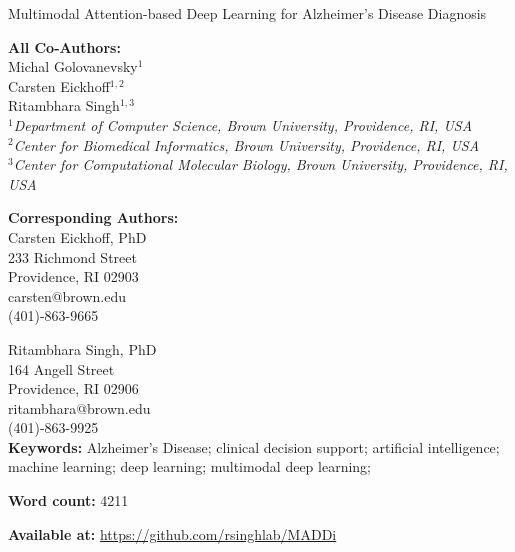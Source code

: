\documentclass[11pt]{article}
\begin{document}
\begin{titlepage}
    \begin{center}
        \vspace*{1cm}

        \LARGE{Multimodal Attention-based Deep Learning for Alzheimer’s Disease Diagnosis}
        \vspace*{1cm}
    \end{center}
    
    \noindent \large{\textbf{All Co-Authors:}}\vspace*{0.1cm}\\
    \noindent Michal Golovanevsky$^1$\\
    \noindent Carsten Eickhoff$^{1,2}$\\
    \noindent Ritambhara Singh$^{1,3}$\\
    
    \noindent \footnotesize{\textit{$^1$Department of Computer Science, Brown University, Providence, RI, USA}}\\
    \footnotesize{\textit{$^2$Center for Biomedical Informatics, Brown University, Providence, RI, USA}}\\
    \footnotesize{\textit{$^3$Center for Computational Molecular Biology, Brown University, Providence, RI, USA}}\\
        
    \vspace*{1cm}
    
    \noindent \large{\textbf{Corresponding Authors:}}\vspace*{0.1cm}\\
    \noindent Carsten Eickhoff, PhD\\
    233 Richmond Street\\
    Providence, RI 02903\\
    carsten@brown.edu\\
    (401)-863-9665 \\
    \vspace*{0.25cm}
    
    \noindent Ritambhara Singh, PhD\\
    164 Angell Street\\
    Providence, RI 02906\\
    ritambhara@brown.edu\\
    (401)-863-9925\\
    
    \vspace*{1cm}
    \noindent \large{\textbf{Keywords:}} Alzheimer’s Disease; clinical decision support; artificial intelligence; machine learning; deep learning; multimodal deep learning;
    \vspace*{1cm}
    
    \noindent \large{\textbf{Word count:}} 4211
    \vspace*{1cm}
    
    \noindent
    \textbf{Available at:} \url{https://github.com/rsinghlab/MADDi}
    \noindent


        


            

\end{titlepage}
\end{document}
